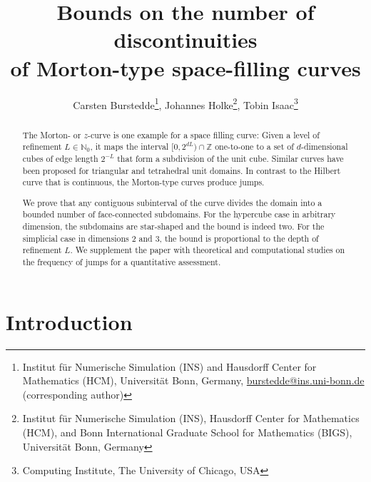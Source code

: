 \documentclass[a4paper,11pt]{article}
\author{Carsten Burstedde\footnote{Institut f\"ur Numerische Simulation (INS)
          and Hausdorff Center for Mathematics (HCM),
          Universit\"at Bonn, Germany,
          \href{mailto:burstedde@ins.uni-bonn.de}{burstedde@ins.uni-bonn.de}
          (corresponding author)},
        Johannes Holke\footnote{Institut f\"ur Numerische Simulation (INS),
          Hausdorff Center for Mathematics (HCM),
          and Bonn International Graduate School for Mathematics (BIGS),
          Universit\"at Bonn, Germany},
        Tobin Isaac\footnote{Computing Institute, The University of Chicago, USA}
      }
\title{Bounds on the number of discontinuities\\
       of Morton-type space-filling curves}
\newcommand{\sN}{\mathbb{N}}
\newcommand{\sZ}{\mathbb{Z}}
\newcommand{\seclab}[1]{\label{sec:#1}}
\begin{document}
\maketitle

\begin{abstract}
The Morton- or $z$-curve is one example for a space filling curve: Given a
level of refinement $L \in \sN_0$, it maps the interval $[0, 2^{dL}) \cap \sZ$
one-to-one to a set of $d$-dimensional cubes of edge length $2^{-L}$ that form
a
subdivision of the unit cube.
Similar curves have been proposed for triangular and tetrahedral unit domains.
In contrast to the Hilbert curve that is continuous, the Morton-type curves
produce jumps.

We prove that any contiguous subinterval of the curve divides the domain into a
bounded number of face-connected subdomains.
For the hypercube case in arbitrary dimension, the subdomains are star-shaped
and the bound is indeed two.
For the simplicial case in dimensions 2 and 3, the bound is proportional to the
depth of refinement $L$.
We supplement the paper with theoretical and computational studies on the
frequency of jumps for a quantitative assessment.
\end{abstract}

\section{Introduction}
\seclab{intro}
\end{document}
